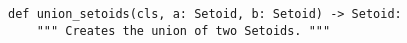 \begin{verbatim}
def union_setoids(cls, a: Setoid, b: Setoid) -> Setoid:
    """ Creates the union of two Setoids. """
\end{verbatim}
